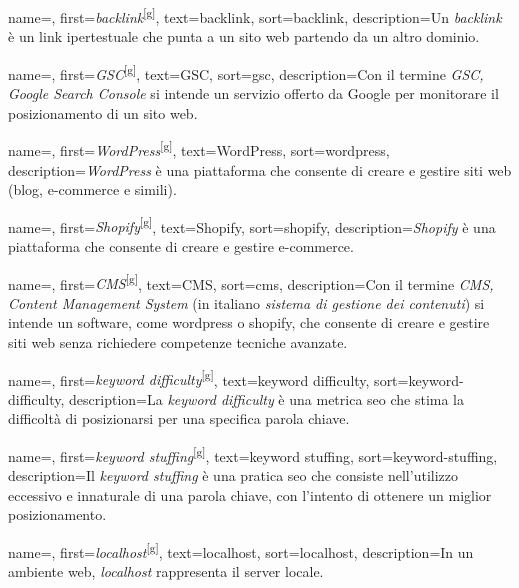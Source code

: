  {
    name=,
    first={\textit{backlink}\textsuperscript{[g]}},
    text=backlink,
    sort=backlink,
    description={Un \textit{backlink} è un link ipertestuale che punta a un sito web partendo da un altro dominio.}
}

 {
    name=,
    first={\textit{GSC}\textsuperscript{[g]}},
    text=GSC,
    sort=gsc,
    description={Con il termine \textit{GSC, Google Search Console} si intende un servizio offerto da Google per monitorare il posizionamento di un sito web.}
}

 {
    name=,
    first={\textit{WordPress}\textsuperscript{[g]}},
    text=WordPress,
    sort=wordpress,
    description={\textit{WordPress} è una piattaforma che consente di creare e gestire siti web (blog, e-commerce e simili).}
}

 {
    name=,
    first={\textit{Shopify}\textsuperscript{[g]}},
    text=Shopify,
    sort=shopify,
    description={\textit{Shopify} è una piattaforma che consente di creare e gestire e-commerce.}
}

 {
    name=,
    first={\textit{CMS}\textsuperscript{[g]}},
    text=CMS,
    sort=cms,
    description={Con il termine \textit{CMS, Content Management System} (in italiano \textit{sistema di gestione dei contenuti}) si intende un software, come \gls{wordpress} o \gls{shopify}, che consente di creare e gestire siti web senza richiedere competenze tecniche avanzate.}
}

 {
    name=,
    first={\textit{keyword difficulty}\textsuperscript{[g]}},
    text=keyword difficulty,
    sort=keyword-difficulty,
    description={La \textit{keyword difficulty} è una metrica \gls{seo} che stima la difficoltà di posizionarsi per una specifica parola chiave.}
}

 {
    name=,
    first={\textit{keyword stuffing}\textsuperscript{[g]}},
    text=keyword stuffing,
    sort=keyword-stuffing,
    description={Il \textit{keyword stuffing} è una pratica \gls{seo} che consiste nell'utilizzo eccessivo e innaturale di una parola chiave, con l'intento di ottenere un miglior posizionamento.}
}

 {
    name=,
    first={\textit{localhost}\textsuperscript{[g]}},
    text=localhost,
    sort=localhost,
    description={In un ambiente web, \textit{localhost} rappresenta il server locale.}
}

